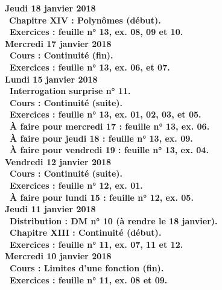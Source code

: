 \documentclass[12pt,a4paper]{article}
\begin{document}
\noindent\textbf{Jeudi 18 janvier 2018}\\
\bu\ \bf Chapitre XIV \rm : Polynômes (début).\\
\bu\ Exercices : feuille n° 13, ex. 08, 09 et 10.\vspace{.4cm}\\

\noindent\textbf{Mercredi 17 janvier 2018} \\
\bu\ Cours : Continuité (fin).\\
\bu\ Exercices : feuille n° 13, ex. 06, et 07.\vspace{.4cm}\\

\noindent\textbf{Lundi 15 janvier 2018} \\
\bu\ Interrogation surprise n° 11.\\
\bu\ Cours : Continuité (suite).\\
\bu\ Exercices : feuille n° 13, ex. 01, 02, 03, et 05.\\
\bu\ À faire pour mercredi 17 : feuille n° 13, ex. 06.\\
\bu\ À faire pour jeudi 18 : feuille n° 13, ex. 09.\\
\bu\ À faire pour vendredi 19 : feuille n° 13, ex. 04.\vspace{.4cm}\\

\noindent\textbf{Vendredi 12 janvier 2018}\\
\bu\ Cours : Continuité (suite).\\
\bu\ Exercices : feuille n° 12, ex. 01.\\
\bu\ À faire pour lundi 15 : feuille n° 12, ex. 05.\vspace{.4cm}\\

\noindent\textbf{Jeudi 11 janvier 2018}\\
\bu\ Distribution : DM n° 10 (à rendre le 18 janvier).\\
\bu\ \bf Chapitre XIII \rm : Continuité (début).\\
\bu\ Exercices : feuille n° 11, ex. 07, 11 et 12.\vspace{.4cm}\\

\noindent\textbf{Mercredi 10 janvier 2018} \\
\bu\ Cours : Limites d'une fonction (fin).\\
\bu\ Exercices : feuille n° 11, ex. 08 et 09.\vspace{.4cm}\\
\end{document}
